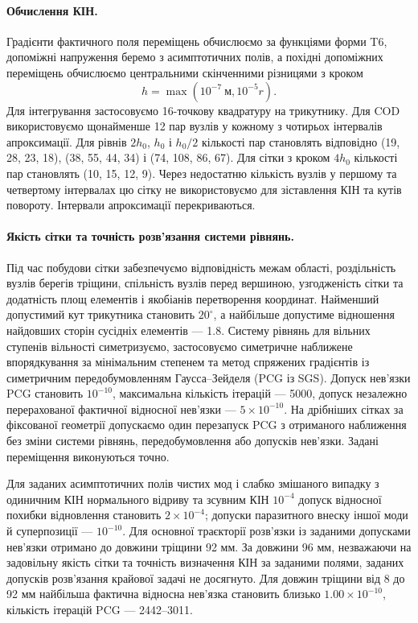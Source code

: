 \documentclass[a4paper,12pt]{article}
\newcommand{\MaxTrueResidual}{1.00\times10^{-10}}
\begin{document}
\paragraph{Обчислення КІН.}
Градієнти фактичного поля переміщень обчислюємо за функціями форми T6, допоміжні напруження
беремо з асимптотичних полів, а похідні допоміжних переміщень обчислюємо центральними
скінченними різницями з кроком
\[
 h=\max(10^{-7}\ \text{м},10^{-5}r).
\]
Для інтегрування застосовуємо 16-точкову квадратуру на трикутнику. Для COD використовуємо
щонайменше 12 пар вузлів у кожному з чотирьох інтервалів апроксимації. Для рівнів $2h_0$, $h_0$
і $h_0/2$ кількості пар становлять відповідно (19, 28, 23, 18), (38, 55, 44, 34) і (74, 108, 86, 67).
Для сітки з кроком $4h_0$ кількості пар становлять (10, 15, 12, 9).
Через недостатню кількість вузлів у першому та четвертому інтервалах цю сітку
не використовуємо для зіставлення КІН та кутів повороту. Інтервали апроксимації
перекриваються.

\paragraph{Якість сітки та точність розв’язання системи рівнянь.}
Під час побудови сітки забезпечуємо відповідність межам області, роздільність вузлів берегів
тріщини, спільність вузлів перед вершиною, узгодженість сітки та додатність площ елементів
і якобіанів перетворення координат.
Найменший допустимий кут трикутника становить $20^\circ$, а найбільше допустиме відношення
найдовших сторін сусідніх елементів --- 1.8.
Систему рівнянь для вільних ступенів вільності симетризуємо, застосовуємо симетричне наближене
впорядкування за мінімальним степенем та метод спряжених градієнтів із симетричним
передобумовленням Гаусса--Зейделя (PCG із SGS).
Допуск нев’язки PCG становить $10^{-10}$, максимальна кількість ітерацій --- 5000,
допуск незалежно перерахованої фактичної відносної нев’язки --- $5\times10^{-10}$.
На дрібніших сітках за фіксованої геометрії допускаємо один перезапуск PCG з отриманого
наближення без зміни системи рівнянь, передобумовлення або допусків нев’язки.
Задані переміщення виконуються точно.

Для заданих асимптотичних полів чистих мод і слабко змішаного випадку з одиничним КІН
нормального відриву та зсувним КІН $10^{-4}$ допуск відносної похибки відновлення становить
$2\times10^{-4}$; допуски паразитного внеску іншої моди й суперпозиції --- $10^{-10}$.
Для основної траєкторії розв’язки із заданими допусками нев’язки отримано до довжини тріщини 92 мм.
За довжини 96 мм, незважаючи на задовільну якість сітки та точність визначення КІН за
заданими полями, заданих допусків розв’язання крайової задачі не досягнуто.
Для довжин тріщини від 8 до 92 мм найбільша фактична відносна нев’язка становить близько
$\MaxTrueResidual$, кількість ітерацій PCG --- 2442--3011.
\end{document}
